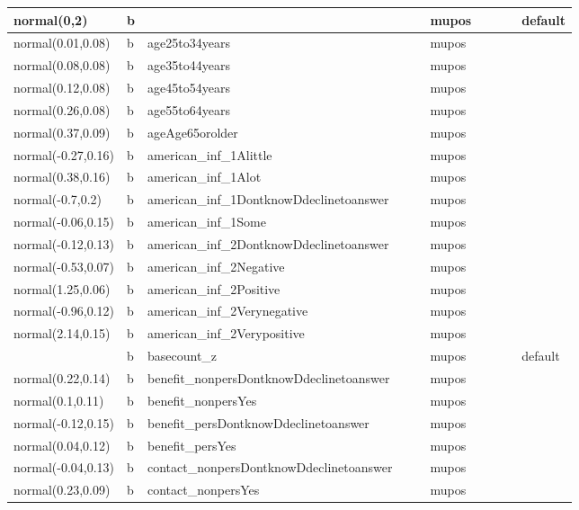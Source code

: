 \documentclass[
]{book}
\theoremstyle{definition}
\theoremstyle{definition}
\theoremstyle{definition}
\theoremstyle{definition}
\theoremstyle{remark}
\begin{document}
\begin{table}
\begin{tabular}[t]{l|l|l|l|l|l|l|l|l|l}
\hline
normal(0,2) & b &  &  &  & mupos &  &  &  & default\\
\hline
normal(0.01,0.08) & b & age25to34years &  &  & mupos &  &  &  & \\
\hline
normal(0.08,0.08) & b & age35to44years &  &  & mupos &  &  &  & \\
\hline
normal(0.12,0.08) & b & age45to54years &  &  & mupos &  &  &  & \\
\hline
normal(0.26,0.08) & b & age55to64years &  &  & mupos &  &  &  & \\
\hline
normal(0.37,0.09) & b & ageAge65orolder &  &  & mupos &  &  &  & \\
\hline
normal(-0.27,0.16) & b & american\_inf\_1Alittle &  &  & mupos &  &  &  & \\
\hline
normal(0.38,0.16) & b & american\_inf\_1Alot &  &  & mupos &  &  &  & \\
\hline
normal(-0.7,0.2) & b & american\_inf\_1DontknowDdeclinetoanswer &  &  & mupos &  &  &  & \\
\hline
normal(-0.06,0.15) & b & american\_inf\_1Some &  &  & mupos &  &  &  & \\
\hline
normal(-0.12,0.13) & b & american\_inf\_2DontknowDdeclinetoanswer &  &  & mupos &  &  &  & \\
\hline
normal(-0.53,0.07) & b & american\_inf\_2Negative &  &  & mupos &  &  &  & \\
\hline
normal(1.25,0.06) & b & american\_inf\_2Positive &  &  & mupos &  &  &  & \\
\hline
normal(-0.96,0.12) & b & american\_inf\_2Verynegative &  &  & mupos &  &  &  & \\
\hline
normal(2.14,0.15) & b & american\_inf\_2Verypositive &  &  & mupos &  &  &  & \\
\hline
 & b & basecount\_z &  &  & mupos &  &  &  & default\\
\hline
normal(0.22,0.14) & b & benefit\_nonpersDontknowDdeclinetoanswer &  &  & mupos &  &  &  & \\
\hline
normal(0.1,0.11) & b & benefit\_nonpersYes &  &  & mupos &  &  &  & \\
\hline
normal(-0.12,0.15) & b & benefit\_persDontknowDdeclinetoanswer &  &  & mupos &  &  &  & \\
\hline
normal(0.04,0.12) & b & benefit\_persYes &  &  & mupos &  &  &  & \\
\hline
normal(-0.04,0.13) & b & contact\_nonpersDontknowDdeclinetoanswer &  &  & mupos &  &  &  & \\
\hline
normal(0.23,0.09) & b & contact\_nonpersYes &  &  & mupos &  &  &  & \\

\end{tabular}
\end{table}
\end{document}
